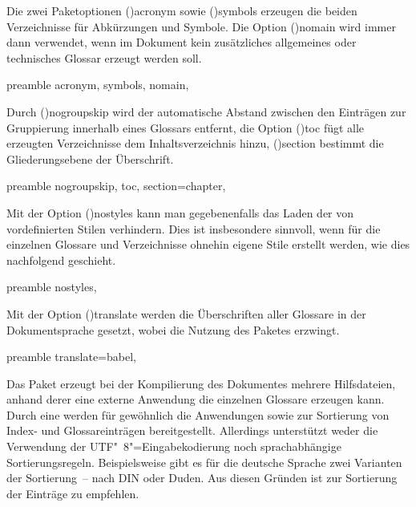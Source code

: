 \documentclass[%
  english,ngerman,%
  cdgeometry=no,DIV=12,%
  cd=false,cdfont=false,cdtitle=true,%
  headings=normal,%
  automark,%
  listof=toc,%
]{tudscrartcl}
\begin{document}
Die zwei Paketoptionen \Option(){acronym} sowie 
\Option(){symbols} erzeugen die beiden Verzeichnisse für 
Abkürzungen und Symbole. Die Option \Option(){nomain} wird 
immer dann verwendet, wenn im Dokument kein zusätzliches allgemeines oder 
technisches Glossar erzeugt werden soll.
%
\begin{Code}{preamble}
  acronym,%
  symbols,%
  nomain,%
\end{Code}

Durch \Option(){nogroupskip} wird der automatische Abstand 
zwischen den Einträgen zur Gruppierung innerhalb eines Glossars entfernt, die 
Option \Option(){toc} fügt alle erzeugten Verzeichnisse 
dem Inhaltsverzeichnis hinzu, \Option(){section} bestimmt 
die Gliederungsebene der Überschrift.
%
\begin{Code}{preamble}
  nogroupskip,%
  toc,%
  section=chapter,%
\end{Code}

Mit der Option \Option(){nostyles} kann man gegebenenfalls 
das Laden der von  vordefinierten Stilen verhindern. Dies 
ist insbesondere sinnvoll, wenn für die einzelnen Glossare und Verzeichnisse 
ohnehin eigene Stile erstellt werden, wie dies nachfolgend geschieht.
%
\begin{Code}{preamble}
  nostyles,%
\end{Code}

Mit der Option \Option(){translate} werden die Überschriften
aller Glossare in der Dokumentsprache gesetzt, wobei  
die Nutzung des Paketes  erzwingt. 
%
\begin{Code}{preamble}
  translate=babel,%
\end{Code}

Das Paket  erzeugt bei der Kompilierung des Dokumentes 
mehrere Hilfsdateien, anhand derer eine externe Anwendung die einzelnen 
Glossare erzeugen kann. Durch eine \Distro* werden für gewöhnlich die 
Anwendungen  sowie  zur Sortierung 
von Index- und Glossareinträgen bereitgestellt. Allerdings unterstützt 
 weder die Verwendung der UTF"~8"=Eingabekodierung noch 
sprachabhängige Sortierungsregeln. Beispielsweise gibt es für die deutsche 
Sprache zwei Varianten der Sortierung~-- nach DIN oder Duden. Aus diesen 
Gründen ist zur Sortierung der Einträge  zu empfehlen.
\end{document}
